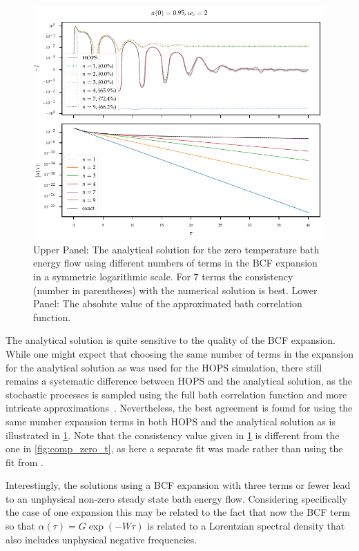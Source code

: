 \begin{figure}[h]
  \centering
  \includegraphics{figs/analytic_comp/analytical_terms_important.pdf}
  \caption{\label{fig:analytical_terms_important} Upper Panel: The analytical
    solution for the zero temperature bath energy flow using different
    numbers of terms in the BCF expansion in a symmetric logarithmic
    scale. For \(7\) terms the consistency (number in parentheses)
    with the numerical solution is best. Lower Panel: The absolute
    value of the approximated bath correlation function.}
\end{figure}
The analytical solution is quite sensitive to the quality of the BCF
expansion.  While one might expect that choosing the same number of
terms in the expansion for the analytical solution as was used for the
HOPS simulation, there still remains a systematic difference between
HOPS and the analytical solution, as the stochastic processes is
sampled using the full bath correlation function and more intricate
approximations~\cite{RichardDiss}.  Nevertheless, the best agreement
is found for using the same number expansion terms in both HOPS and
the analytical solution as is illustrated in
\cref{fig:analytical_terms_important}. Note that the consistency value
given in \cref{fig:analytical_terms_important} is different from the
one in \cref{fig:comp_zero_t}, as here a separate fit was made rather
than using the fit from \cite{RichardDiss}.

Interestingly, the solutions using a BCF expansion with three terms or
fewer lead to an unphysical non-zero steady state bath energy
flow. Considering specifically the case of one expansion this may be
related to the fact that now the BCF  term so that
\(α(τ)=G \exp(-Wτ)\) is related to a Lorentzian spectral density that
also includes unphysical negative frequencies.

